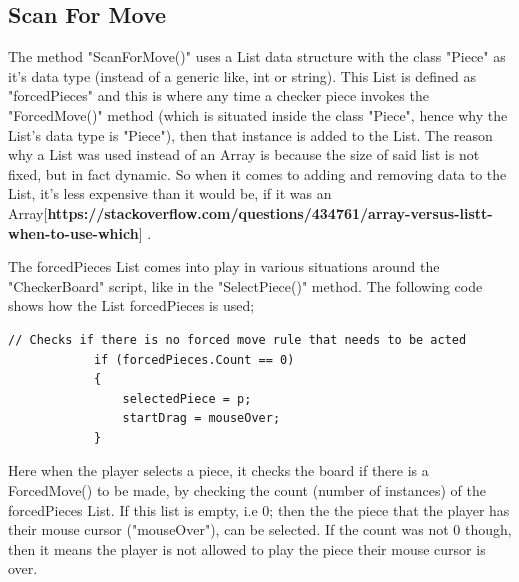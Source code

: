 \documentclass[10pt, a4paper]{article}
\begin{document}
	 \subsection{Scan For Move}
	 The method "ScanForMove()" uses a List data structure with the class "Piece" as it's data type (instead of a generic like, int or string). This List is defined as "forcedPieces" and this is where any time a checker piece invokes the "ForcedMove()" method (which is situated inside the class "Piece", hence why the List's data type is "Piece"), then that instance is added to the List. The reason why a List was used instead of an Array is because the size of said list is not fixed, but in fact dynamic. So when it comes to adding and removing data to the List, it's less expensive than it would be, if it was an Array[\textbf{https://stackoverflow.com/questions/434761/array-versus-listt-when-to-use-which}] .
	 
	 The forcedPieces List comes into play in various situations around the "CheckerBoard" script, like in the "SelectPiece()" method. The following code shows how the List forcedPieces is used;
	 \begin{lstlisting}[caption = SelectPiece()]
	 // Checks if there is no forced move rule that needs to be acted
            if (forcedPieces.Count == 0)
            {
                selectedPiece = p;
                startDrag = mouseOver;
            }
	 \end{lstlisting}
	 Here when the player selects a piece, it checks the board if there is a ForcedMove() to be made, by checking the count (number of instances) of the forcedPieces List. If this list is empty, i.e 0; then the the piece that the player has their mouse cursor ("mouseOver"), can be selected. If the count was not 0 though, then it means the player is not allowed to play the piece their mouse cursor is over.
	 
\end{document}

